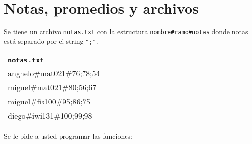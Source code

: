 \section{Notas, promedios y archivos}

Se tiene un archivo \texttt{notas.txt} con la estructura \texttt{nombre\#ramo\#notas} donde notas está separado por el string \texttt{";"}.

\begin{center}

\begin{tabular}{|l|}
    \hline
    \texttt{notas.txt} \\ 
    \hline
    anghelo\#mat021\#76;78;54 \\
    miguel\#mat021\#80;56;67 \\
    miguel\#fis100\#95;86;75 \\
    diego\#iwi131\#100;99;98 \\
    \hline
\end{tabular}
\end{center}


Se le pide a usted programar las funciones:

